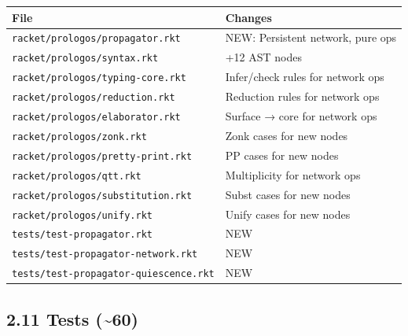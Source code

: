 \documentclass[11pt]{article}
\begin{document}
\begin{center}
\begin{tabular}{ll}
File & Changes\\
\hline
\texttt{racket/prologos/propagator.rkt} & NEW: Persistent network, pure ops\\
\texttt{racket/prologos/syntax.rkt} & +12 AST nodes\\
\texttt{racket/prologos/typing-core.rkt} & Infer/check rules for network ops\\
\texttt{racket/prologos/reduction.rkt} & Reduction rules for network ops\\
\texttt{racket/prologos/elaborator.rkt} & Surface → core for network ops\\
\texttt{racket/prologos/zonk.rkt} & Zonk cases for new nodes\\
\texttt{racket/prologos/pretty-print.rkt} & PP cases for new nodes\\
\texttt{racket/prologos/qtt.rkt} & Multiplicity for network ops\\
\texttt{racket/prologos/substitution.rkt} & Subst cases for new nodes\\
\texttt{racket/prologos/unify.rkt} & Unify cases for new nodes\\
\texttt{tests/test-propagator.rkt} & NEW\\
\texttt{tests/test-propagator-network.rkt} & NEW\\
\texttt{tests/test-propagator-quiescence.rkt} & NEW\\
\end{tabular}
\end{center}
\subsection{2.11 Tests (\textasciitilde{}60)}
\label{sec:org67ed484}
\end{document}
